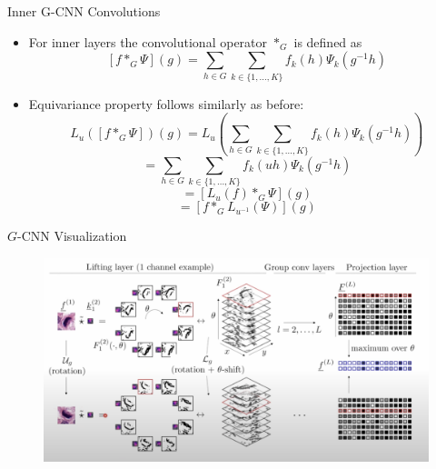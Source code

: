 \documentclass{beamer}
\begin{document}
\begin{frame}{Inner G-CNN Convolutions}
    \begin{itemize}
        \item For inner layers the convolutional operator $*_G$ is defined as 
        $$[f *_G \Psi](g) = \sum_{h \in G} \sum_{k \in \{1, \dots, K\}} f_k(h)\Psi_k(g^{-1}h)$$
        \item Equivariance property follows similarly as before:
        $$L_{u}([f *_G \Psi])(g) = L_{u}\left(\sum_{h \in G} \sum_{k \in \{1, \dots, K\}} f_k(h)\Psi_k(g^{-1}h)\right)$$
        $$= \sum_{h \in G} \sum_{k \in \{1, \dots, K\}} f_k(uh)\Psi_k(g^{-1}h)$$
        $$ = [L_{u}(f) *_G \Psi](g) $$
        $$ = [f *_G L_{u^{-1}}(\Psi)](g)$$
    \end{itemize}
\end{frame}

\begin{frame}{$G$-CNN Visualization}
    \begin{figure}
        \centering
        \includegraphics[width=\textwidth,height=\textheight,keepaspectratio]{Screenshot 2024-01-15 at 12.20.40 PM.png}
    \end{figure}
\end{frame}
\end{document}

